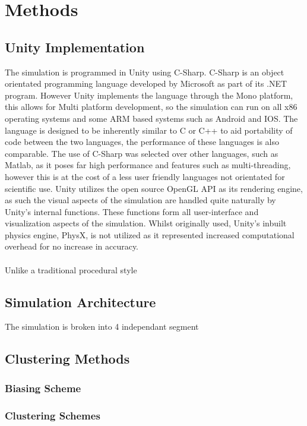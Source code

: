 \section{Methods}
\subsection{Unity Implementation}
The simulation is programmed in Unity using C-Sharp. C-Sharp is an object orientated programming language developed by Microsoft as part of its .NET program. However Unity implements the language through the Mono platform, this allows for Multi platform development, so the simulation can run on all x86 operating systems and some ARM based systems such as Android and IOS. The language is designed to be inherently similar to C or C++ to aid portability of code between the two languages, the performance of these languages is also comparable. The use of C-Sharp was selected over other languages, such as Matlab, as it poses far high performance and features such as multi-threading, however this is at the cost of a less user friendly languages not orientated for scientific use. Unity utilizes the open source OpenGL API as its rendering engine, as such the visual aspects of the simulation are handled quite naturally by Unity's internal functions. These functions form all user-interface and visualization aspects of the simulation. Whilst originally used, Unity's inbuilt physics engine, PhysX, is not utilized as it represented increased computational overhead for no increase in accuracy.
\\\\
Unlike a traditional procedural style 

\subsection{Simulation Architecture}
The simulation is broken into 4 independant segment

\subsection{Clustering Methods}

\subsubsection{Biasing Scheme}

\subsubsection{Clustering Schemes}


